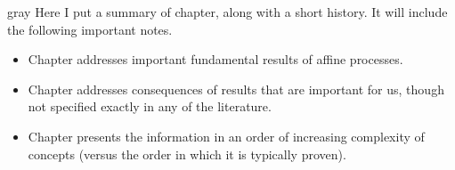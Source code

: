 \begin{color}{gray}
  Here I put a summary of chapter, along with a short history.
  It will include the following important notes.
  \begin{itemize}
    \item
      Chapter addresses important fundamental results of affine processes.
    \item
      Chapter addresses consequences of results that are important for us, though not specified exactly in any of the literature.
    \item
      Chapter presents the information in an order of increasing complexity of concepts (versus the order in which it is typically proven).
  \end{itemize}
\end{color}

